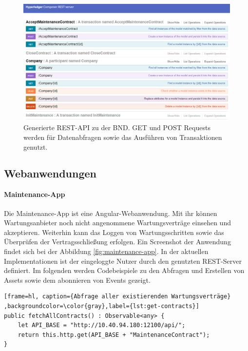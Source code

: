 \begin{figure}[htb]
    \centering
      \includegraphics[width=1.0\textwidth,angle=0]{images/rest-api}
       \caption{Generierte REST-API zu der BND. GET und POST Requests werden für Datenabfragen sowie das Ausführen von Transaktionen genutzt.}
      \label{fig:rest-api}
\end{figure}

\subsection{Webanwendungen}

\paragraph{Maintenance-App}
Die Maintenance-App ist eine Angular-Webanwendung. Mit ihr können Wartungsanbieter noch nicht angenommene Wartungsverträge einsehen und akzeptieren. Weiterhin kann das Loggen von Wartungsschritten sowie das Überprüfen der Vertragsschließung erfolgen. Ein Screenshot der Anwendung findet sich bei der Abbildung \ref{fig:maintenance-app}. In der aktuellen Implementationen ist der eingeloggte Nutzer durch den genutzten REST-Server definiert. Im folgenden werden Codebeispiele zu den Abfragen und Erstellen von Assets sowie dem abonnieren von Events gezeigt.

\begin{lstfloat}
\begin{lstlisting}[frame=hl, caption={Abfrage aller existierenden Wartungsverträge} ,backgroundcolor=\color{gray},label={lst:get-contracts}]
public fetchAllContracts() : Observable<any> {
    let API_BASE = "http://10.40.94.180:12100/api/";
    return this.http.get(API_BASE + "MaintenanceContract");
}
\end{lstlisting} 
\end{lstfloat}

